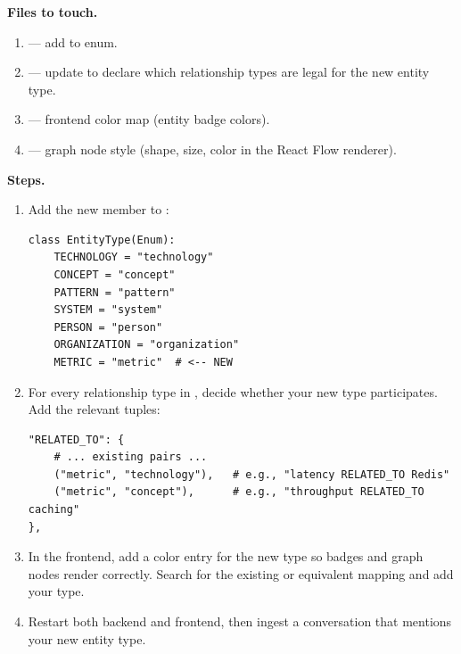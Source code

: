 \medskip\noindent\textbf{Files to touch.}

\begin{enumerate}
    \item {} --- add to 
          enum.
    \item {} --- update
           to declare which relationship
          types are legal for the new entity type.
    \item {} --- frontend color map (entity badge
          colors).
    \item {} --- graph node style (shape, size, color in
          the React Flow renderer).
\end{enumerate}

\medskip\noindent\textbf{Steps.}

\begin{enumerate}
    \item Add the new member to :
\begin{lstlisting}[style=python]
class EntityType(Enum):
    TECHNOLOGY = "technology"
    CONCEPT = "concept"
    PATTERN = "pattern"
    SYSTEM = "system"
    PERSON = "person"
    ORGANIZATION = "organization"
    METRIC = "metric"  # <-- NEW
\end{lstlisting}

    \item For every relationship type in
          , decide whether your new type
          participates.  Add the relevant  tuples:

\begin{lstlisting}[style=python]
"RELATED_TO": {
    # ... existing pairs ...
    ("metric", "technology"),   # e.g., "latency RELATED_TO Redis"
    ("metric", "concept"),      # e.g., "throughput RELATED_TO caching"
},
\end{lstlisting}

    \item In the frontend, add a color entry for the new type so badges and
          graph nodes render correctly.  Search for the existing
           or equivalent mapping and add your type.
    \item Restart both backend and frontend, then ingest a conversation
          that mentions your new entity type.
\end{enumerate}

